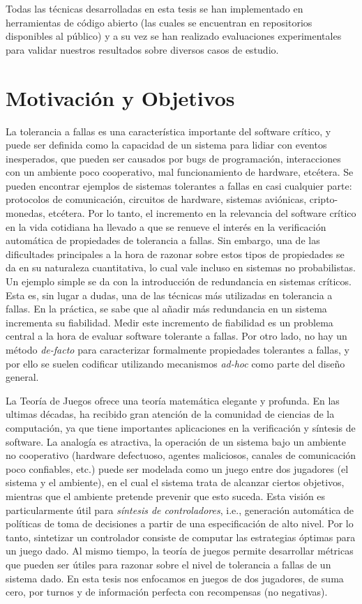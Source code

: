Todas las técnicas desarrolladas en esta tesis se han implementado en herramientas de código abierto (las cuales se encuentran en repositorios disponibles al público) y a su vez se han realizado evaluaciones experimentales para validar nuestros resultados sobre diversos casos de estudio.

\section{Motivación y Objetivos}
\label{sec:intro.objetivos}

La tolerancia a fallas es una característica importante del software crítico, y puede ser definida como la capacidad de un sistema para lidiar con eventos inesperados, que pueden ser causados por bugs de programación, interacciones con un ambiente poco cooperativo, mal funcionamiento de hardware, etcétera. Se pueden encontrar ejemplos de sistemas tolerantes a fallas en casi cualquier parte: protocolos de comunicación, circuitos de hardware, sistemas aviónicas, cripto-monedas, etcétera. Por lo tanto, el incremento en la relevancia del software crítico en la vida cotidiana ha llevado a que se renueve el interés en la verificación automática de propiedades de tolerancia a fallas. Sin embargo, una de las dificultades principales a la hora de razonar sobre estos tipos de propiedades se da en su naturaleza cuantitativa, lo cual vale incluso en sistemas no probabilistas.
Un ejemplo simple se da con la introducción de redundancia en sistemas críticos. Esta es, sin lugar a dudas, una de las técnicas más utilizadas en tolerancia a fallas.
En la práctica, se sabe que al añadir más redundancia en un sistema incrementa su fiabilidad. Medir este incremento de fiabilidad es un problema central a la hora de evaluar software tolerante a fallas. Por otro lado, no hay un método \textit{de-facto} para caracterizar formalmente propiedades tolerantes a fallas, y por ello se suelen codificar utilizando mecanismos \textit{ad-hoc} como parte del diseño general.

La Teoría de Juegos \cite{MorgensternNeuman42} ofrece una teoría matemática elegante y profunda. 
En las ultimas décadas, ha recibido gran atención de la comunidad de ciencias de la computación, ya que tiene importantes aplicaciones en la verificación y síntesis de software. 
La analogía es atractiva, la operación de un sistema bajo un ambiente no cooperativo (hardware defectuoso, agentes maliciosos, canales de comunicación poco confiables, etc.) puede ser modelada como un juego entre dos jugadores (el sistema y el ambiente), en el cual el sistema trata de alcanzar ciertos objetivos, mientras que el ambiente pretende prevenir que esto suceda. 
Esta visión es particularmente útil para \textit{síntesis de controladores}, i.e., generación automática de políticas de toma de decisiones a partir de una especificación de alto nivel. 
Por lo tanto, sintetizar un controlador consiste de computar las estrategias óptimas para un juego dado. Al mismo tiempo, la teoría de juegos permite desarrollar métricas que pueden ser útiles para razonar sobre el nivel de tolerancia a fallas de un sistema dado.
En esta tesis nos enfocamos en juegos de dos jugadores, de suma cero, por turnos y de información perfecta con recompensas (no negativas)\cite{FilarV96}. 

